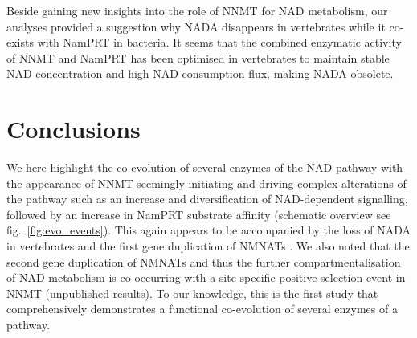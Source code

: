 Beside gaining new insights into the role of NNMT for NAD metabolism, our analyses provided a suggestion why NADA disappears in vertebrates while it co-exists with NamPRT in bacteria. It seems that the combined enzymatic activity of NNMT and NamPRT has been optimised in vertebrates to maintain stable NAD concentration and high NAD consumption flux, making NADA obsolete.


\section{Conclusions}

We here highlight the co-evolution of several enzymes of the NAD pathway with the appearance of NNMT seemingly initiating and driving complex alterations of the pathway such as an increase and diversification of NAD-dependent signalling, followed by an increase in NamPRT substrate affinity (schematic overview see fig.~\ref{fig:evo_events}). This again appears to be accompanied by the loss of NADA in vertebrates and the first gene duplication of NMNATs \cite{Lau2010}. We also noted that the second gene duplication of NMNATs and thus the further compartmentalisation of NAD metabolism is co-occurring with a site-specific positive selection event in NNMT (unpublished results). To our knowledge, this is the first study that comprehensively demonstrates a functional co-evolution of several enzymes of a pathway.
